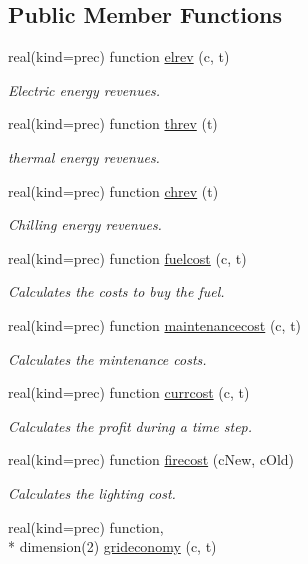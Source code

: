 \subsection*{Public Member Functions}
\begin{DoxyCompactItemize}
\item 
real(kind=prec) function \hyperlink{classeconomy_a4ab4325ba4da5a36bfc71dad24b101c6}{elrev} (c, t)
\begin{DoxyCompactList}\small\item\em Electric energy revenues. \end{DoxyCompactList}\item 
real(kind=prec) function \hyperlink{classeconomy_a5f12114d9d3d02f2d9590df75c787003}{threv} (t)
\begin{DoxyCompactList}\small\item\em thermal energy revenues. \end{DoxyCompactList}\item 
real(kind=prec) function \hyperlink{classeconomy_af1f82a2c63a713af1676de7fb05aadc5}{chrev} (t)
\begin{DoxyCompactList}\small\item\em Chilling energy revenues. \end{DoxyCompactList}\item 
real(kind=prec) function \hyperlink{classeconomy_aa8f3af6fe0e525bc72f54bf369789443}{fuelcost} (c, t)
\begin{DoxyCompactList}\small\item\em Calculates the costs to buy the fuel. \end{DoxyCompactList}\item 
real(kind=prec) function \hyperlink{classeconomy_af6ed48a60d50c438efa98f16deed7520}{maintenancecost} (c, t)
\begin{DoxyCompactList}\small\item\em Calculates the mintenance costs. \end{DoxyCompactList}\item 
real(kind=prec) function \hyperlink{classeconomy_a542c71f53d112855d6a81bf21941c8a9}{currcost} (c, t)
\begin{DoxyCompactList}\small\item\em Calculates the profit during a time step. \end{DoxyCompactList}\item 
real(kind=prec) function \hyperlink{classeconomy_ace504d2735fcf5bab047994e760346a9}{firecost} (c\-New, c\-Old)
\begin{DoxyCompactList}\small\item\em Calculates the lighting cost. \end{DoxyCompactList}\item 
real(kind=prec) function, \\*
dimension(2) \hyperlink{classeconomy_a47cc446e4047749cb8b4ae10372ae3c4}{grideconomy} (c, t)
\end{DoxyCompactItemize}


